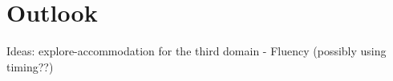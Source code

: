 \chapter{Outlook}
%

Ideas: explore-accommodation for the third domain - Fluency (possibly using timing??) 
